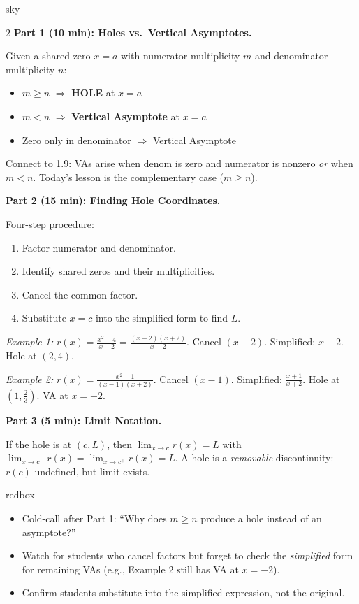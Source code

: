 \documentclass[10pt]{article}
\begin{document}
\begin{skillbox}[Lesson]{sky}
\begin{multicols}{2}
\textbf{Part 1 (10 min): Holes vs.\ Vertical Asymptotes.}

Given a shared zero $x = a$ with numerator multiplicity $m$ and denominator multiplicity $n$:
\begin{itemize}[leftmargin=1.2em,itemsep=2pt,topsep=2pt]
  \item $m \geq n$ $\Rightarrow$ \textbf{HOLE} at $x = a$
  \item $m < n$ $\Rightarrow$ \textbf{Vertical Asymptote} at $x = a$
  \item Zero only in denominator $\Rightarrow$ Vertical Asymptote
\end{itemize}

Connect to 1.9: VAs arise when denom is zero and numerator is nonzero \textit{or} when
$m < n$. Today's lesson is the complementary case ($m \geq n$).

\columnbreak

\textbf{Part 2 (15 min): Finding Hole Coordinates.}

Four-step procedure:
\begin{enumerate}[leftmargin=1.2em,itemsep=2pt,topsep=2pt]
  \item Factor numerator and denominator.
  \item Identify shared zeros and their multiplicities.
  \item Cancel the common factor.
  \item Substitute $x = c$ into the simplified form to find $L$.
\end{enumerate}

\textit{Example 1:} $r(x) = \frac{x^2-4}{x-2} = \frac{(x-2)(x+2)}{x-2}$.
Cancel $(x-2)$. Simplified: $x+2$. Hole at $(2, 4)$.

\textit{Example 2:} $r(x) = \frac{x^2-1}{(x-1)(x+2)}$. Cancel $(x-1)$.
Simplified: $\frac{x+1}{x+2}$. Hole at $\!\left(1, \frac{2}{3}\right)$. VA at $x=-2$.

\textbf{Part 3 (5 min): Limit Notation.}

If the hole is at $(c, L)$, then $\lim_{x \to c} r(x) = L$ with
$\lim_{x \to c^-} r(x) = \lim_{x \to c^+} r(x) = L$.
A hole is a \textit{removable} discontinuity: $r(c)$ undefined, but limit exists.
\end{multicols}
\end{skillbox}

\begin{skillbox}{redbox}
\begin{itemize}[leftmargin=1.2em,itemsep=2pt,topsep=0pt]
  \item Cold-call after Part 1: ``Why does $m \geq n$ produce a hole instead of an asymptote?''
  \item Watch for students who cancel factors but forget to check the \textit{simplified} form
        for remaining VAs (e.g., Example 2 still has VA at $x = -2$).
  \item Confirm students substitute into the simplified expression, not the original.
\end{itemize}
\end{skillbox}
\end{document}
